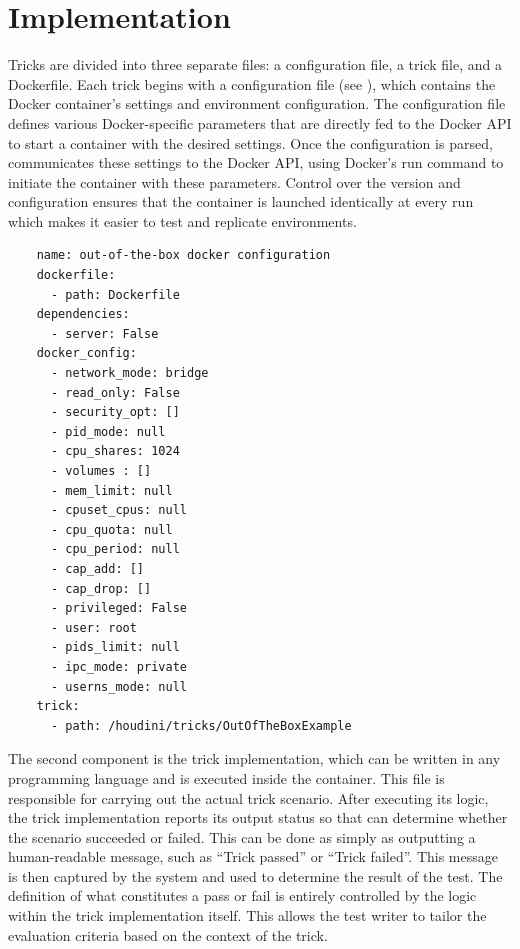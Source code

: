 \section{Implementation}
\label{sec:implementation}

Tricks are divided into three separate files: a configuration file, a trick file, and a Dockerfile. Each \houdini trick begins with a configuration file (see ), which contains the Docker container's settings and environment configuration. The configuration file defines various Docker-specific parameters that are directly fed to the Docker API to start a container with the desired settings. Once the configuration is parsed, \houdini communicates these settings to the Docker API, using Docker's run command to initiate the container with these parameters. Control over the version and configuration ensures that the container is launched identically at every run which makes it easier to test and replicate environments.


\begin{listing}[h]
  \caption{Configuration file for a default Docker out-of-the-box security settings applied when a container is launched.}
  \label{lst:configuration-file}
  \begin{verbatim}
    name: out-of-the-box docker configuration
    dockerfile:
      - path: Dockerfile
    dependencies:
      - server: False
    docker_config: 
      - network_mode: bridge
      - read_only: False
      - security_opt: []
      - pid_mode: null
      - cpu_shares: 1024
      - volumes : []
      - mem_limit: null
      - cpuset_cpus: null
      - cpu_quota: null
      - cpu_period: null
      - cap_add: []
      - cap_drop: []
      - privileged: False
      - user: root
      - pids_limit: null
      - ipc_mode: private
      - userns_mode: null
    trick:
      - path: /houdini/tricks/OutOfTheBoxExample
  \end{verbatim}
\end{listing}



The second component is the trick implementation, which can be written in any programming language and is executed inside the container. This file is responsible for carrying out the actual trick scenario. After executing its logic, the trick implementation reports its output status so that \houdini can determine whether the scenario succeeded or failed. This can be done as simply as outputting a human-readable message, such as ``Trick passed'' or ``Trick failed''. This message is then captured by the system and used to determine the result of the test. The definition of what constitutes a pass or fail is entirely controlled by the logic within the trick implementation itself. This allows the test writer to tailor the evaluation criteria based on the context of the trick.


